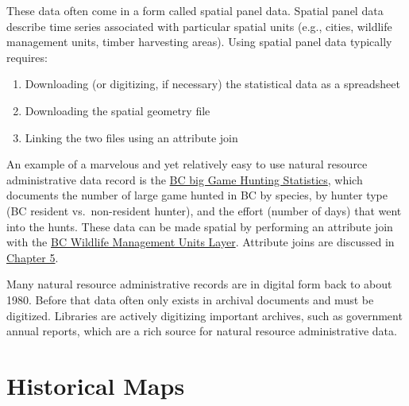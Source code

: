 \documentclass[
]{book}
\providecommand{\tightlist}{%
  \setlength{\itemsep}{0pt}\setlength{\parskip}{0pt}}
\begin{document}
These data often come in a form called spatial panel data. Spatial panel data describe time series associated with particular spatial units (e.g., cities, wildlife management units, timber harvesting areas). Using spatial panel data typically requires:

\begin{enumerate}
\def\labelenumi{\arabic{enumi}.}
\tightlist
\item
  Downloading (or digitizing, if necessary) the statistical data as a spreadsheet
\item
  Downloading the spatial geometry file
\item
  Linking the two files using an attribute join
\end{enumerate}

An example of a marvelous and yet relatively easy to use natural resource administrative data record is the \href{https://catalogue.data.gov.bc.ca/dataset/big-game-harvest-statistics-1976-to-current}{BC big Game Hunting Statistics}, which documents the number of large game hunted in BC by species, by hunter type (BC resident vs.~non-resident hunter), and the effort (number of days) that went into the hunts. These data can be made spatial by performing an attribute join with the \href{https://catalogue.data.gov.bc.ca/dataset/wildlife-management-units}{BC Wildlife Management Units Layer}. Attribute joins are discussed in \href{https://www.opengeomatics.ca/relational-databases.html\#joining-relations}{Chapter 5}.

Many natural resource administrative records are in digital form back to about 1980. Before that data often only exists in archival documents and must be digitized. Libraries are actively digitizing important archives, such as government annual reports, which are a rich source for natural resource administrative data.

\section{Historical Maps}\label{historical-maps}
\end{document}
